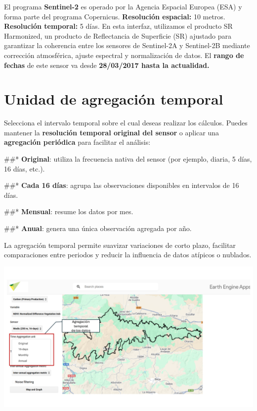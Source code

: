 \documentclass[
]{book}
\begin{document}
El programa \textbf{Sentinel-2} es operado por la Agencia Espacial Europea (ESA) y forma parte del programa Copernicus. \textbf{Resolución espacial:} 10 metros. \textbf{Resolución temporal:} 5 días. En esta interfaz, utilizamos el producto SR Harmonized, un producto de Reflectancia de Superficie (SR) ajustado para garantizar la coherencia entre los sensores de Sentinel-2A y Sentinel-2B mediante corrección atmosférica, ajuste espectral y normalización de datos. El \textbf{rango de fechas} de este sensor va desde \textbf{28/03/2017 hasta la actualidad.}

\chapter{Unidad de agregación temporal}\label{ud-agregacion-temporal}

Selecciona el intervalo temporal sobre el cual deseas realizar los cálculos. Puedes mantener la \textbf{resolución temporal original del sensor} o aplicar una \textbf{agregación periódica} para facilitar el análisis:

\#\#* \textbf{Original}: utiliza la frecuencia nativa del sensor (por ejemplo, diaria, 5 días, 16 días, etc.).

\#\#* \textbf{Cada 16 días}: agrupa las observaciones disponibles en intervalos de 16 días.

\#\#* \textbf{Mensual}: resume los datos por mes.

\#\#* \textbf{Anual}: genera una única observación agregada por año.

La agregación temporal permite suavizar variaciones de corto plazo, facilitar comparaciones entre periodos y reducir la influencia de datos atípicos o nublados.

\includegraphics{assets/aggregation_es.png}
\end{document}
